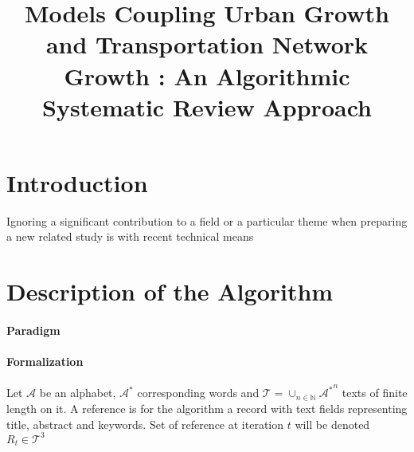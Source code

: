 


\title{Models Coupling Urban Growth and Transportation Network Growth : An Algorithmic Systematic Review Approach
}
\author{}
\date{}


\maketitle

\begin{abstract}

\end{abstract}






\section{Introduction}
Ignoring a significant contribution to a field or a particular theme when preparing a new related study is with recent technical means 


\section{Description of the Algorithm}

\paragraph{Paradigm}


\paragraph{Formalization}
Let $\mathcal{A}$ be an alphabet, $\mathcal{A}^{\ast}$ corresponding words and $\mathcal{T}=\cup_{n\in \mathbb{N}}{\mathcal{A}^{\ast}}^n$ texts of finite length on it. A reference is for the algorithm a record with text fields representing title, abstract and keywords. Set of reference at iteration $t$ will be denoted $R_{t}\in \mathcal{T}^3$



